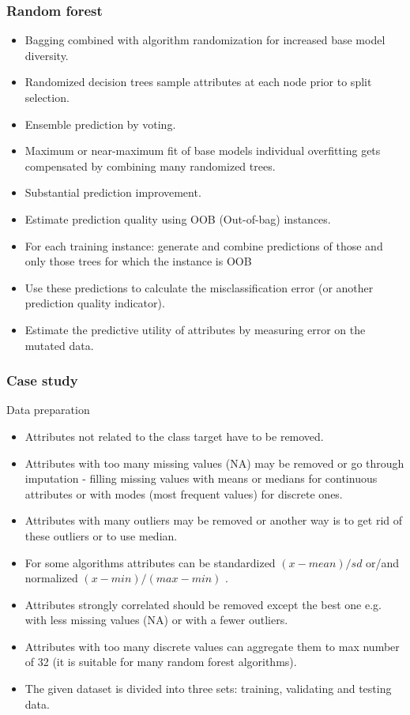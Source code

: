 \documentclass{beamer}
\begin{document}
\begin{frame}
\small
\frametitle{Random forest}
\begin{block}{}
\begin{itemize}
\item Bagging combined with algorithm randomization for increased base model diversity.
\item Randomized decision trees sample attributes at each node prior to split selection.
\item Ensemble prediction by voting.
\item Maximum or near-maximum fit of base models individual overfitting gets compensated by combining many randomized trees.
\item Substantial prediction improvement.
\item Estimate prediction quality using OOB (Out-of-bag) instances.
\item For each training instance: generate and combine predictions of those and only those trees for which the instance is OOB
\item Use these predictions to calculate the misclassification error (or another prediction quality indicator).
\item Estimate the predictive utility of attributes by measuring error on the mutated data.
\end{itemize}
\end{block}
\end{frame}

\begin{frame}
\small
\frametitle{Case study}
\begin{block}{Data preparation}
\begin{itemize}
\item Attributes not related to the class target have to be removed.
\item Attributes with too many missing values (NA) may be removed or go through imputation - filling missing values with means or medians for continuous attributes or with modes (most frequent values) for discrete ones.
\item Attributes with many outliers may be removed or another way is to get rid of these outliers or to use median.
\item For some algorithms attributes can be standardized $(x-mean)/sd$ or/and normalized $(x - min)/(max -min)$ .
\item Attributes strongly correlated should be removed except the best one e.g. with less missing values (NA) or with a fewer outliers.
\item Attributes with too many discrete values can aggregate them to max number of 32 (it is suitable for many random forest algorithms).
\item The given dataset is divided into three sets: training, validating and testing data. 
\end{itemize}
\end{block}
\end{frame}
\end{document}
